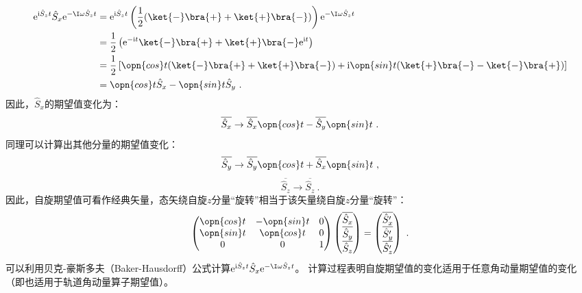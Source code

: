 \begin{equation}
\begin{aligned}
\mathrm e^{\mathrm i \hat S_zt}\hat S_x\mathrm e^{-\mathrm \I\omega \hat S_zt}&=\mathrm e^{\mathrm i \hat S_zt}\left(\frac{1}{2}(\ket{-}\bra{+}+\ket{+}\bra{-})\right)\mathrm e^{-\mathrm \I\omega \hat S_zt}\\
 &=\frac{1}{2}\left(\mathrm e^{-\mathrm i t}\ket{-}\bra{+}+\ket{+}\bra{-}\mathrm e^{\mathrm i t}\right)\\
 &=\frac{1}{2}\left[\opn{cos}t(\ket{-}\bra{+}+\ket{+}\bra{-})+\mathrm i\opn{sin}t(\ket{+}\bra{-}-\ket{-}\bra{+})\right]\\
 &=\opn{cos}t \hat S_x-\opn{sin}t \hat S_y~.
\end{aligned}
\end{equation}
因此，$\hat S_x$的期望值变化为：
\begin{equation}
\overline{\hat S_x}\rightarrow  \overline{\hat S_x}\opn{cos}t-\overline{\hat S_y}\opn{sin}t~.
\end{equation}
同理可以计算出其他分量的期望值变化：
\begin{equation}
\overline{\hat S_y}\rightarrow \overline{\hat S_y}\opn{cos}t+\overline{\hat S_x}\opn{sin}t~,
\end{equation}
\begin{equation}
\overline{\hat S_z}\rightarrow \overline{\hat S_z}~.
\end{equation}
因此，自旋期望值可看作经典矢量，态矢绕自旋$z$分量“旋转”相当于该矢量绕自旋$z$分量“旋转”：
\begin{equation}
\begin{pmatrix}
 \opn{cos}t &-\opn{sin}t  &0 \\
  \opn{sin}t & \opn{cos}t  & 0\\
  0& 0 &1
\end{pmatrix}
\begin{pmatrix}
 \overline{\hat S_x}\\
  \overline{\hat S_y}\\
 \overline{\hat S_z}
\end{pmatrix}
=
\begin{pmatrix}
  \overline{\hat S'_x}\\
  \overline{\hat S'_y}\\
 \overline{\hat S'_z}
\end{pmatrix}~.
\end{equation}
可以利用贝克-豪斯多夫（Baker-Hausdorff）公式计算$\mathrm e^{\mathrm i \hat S_zt}\hat S_x\mathrm e^{-\mathrm \I\omega \hat S_zt}$。
计算过程表明自旋期望值的变化适用于任意角动量期望值的变化（即也适用于轨道角动量算子期望值）。



